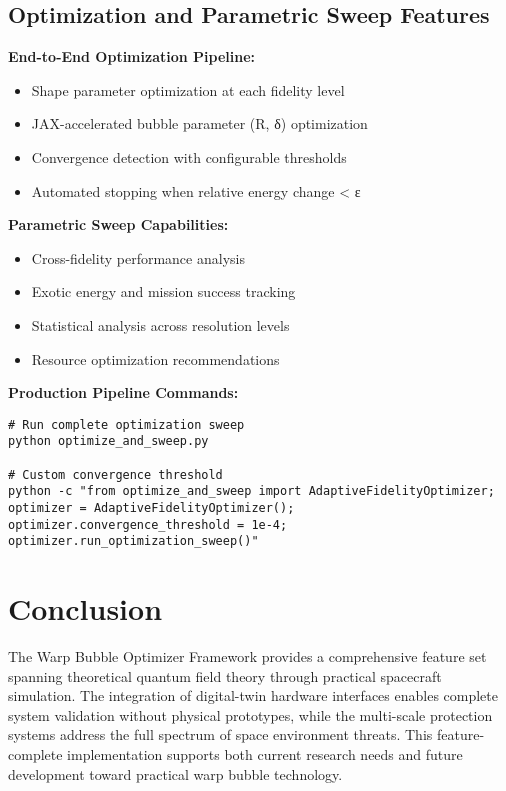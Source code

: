 \documentclass[11pt]{article}
\begin{document}
\subsection{Optimization and Parametric Sweep Features}

\textbf{End-to-End Optimization Pipeline:}
\begin{itemize}
    \item Shape parameter optimization at each fidelity level
    \item JAX-accelerated bubble parameter (R, δ) optimization
    \item Convergence detection with configurable thresholds
    \item Automated stopping when relative energy change < ε
\end{itemize}

\textbf{Parametric Sweep Capabilities:}
\begin{itemize}
    \item Cross-fidelity performance analysis
    \item Exotic energy and mission success tracking
    \item Statistical analysis across resolution levels
    \item Resource optimization recommendations
\end{itemize}

\textbf{Production Pipeline Commands:}
\begin{verbatim}
# Run complete optimization sweep
python optimize_and_sweep.py

# Custom convergence threshold
python -c "from optimize_and_sweep import AdaptiveFidelityOptimizer; 
optimizer = AdaptiveFidelityOptimizer(); 
optimizer.convergence_threshold = 1e-4; 
optimizer.run_optimization_sweep()"
\end{verbatim}

\section{Conclusion}

The Warp Bubble Optimizer Framework provides a comprehensive feature set spanning theoretical quantum field theory through practical spacecraft simulation. The integration of digital-twin hardware interfaces enables complete system validation without physical prototypes, while the multi-scale protection systems address the full spectrum of space environment threats. This feature-complete implementation supports both current research needs and future development toward practical warp bubble technology.
\end{document}
